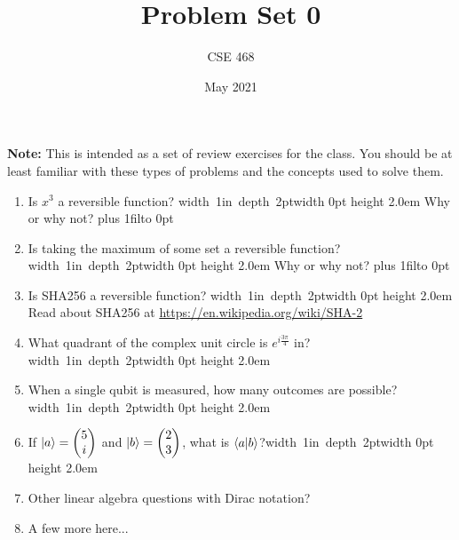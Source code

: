 \documentclass[12pt]{article}
\title{Problem Set 0}
\author{CSE 468}
\date{May 2021}
\newcommand{\Blank}{\mbox{\vrule width 1in depth 2pt}\vrule width 0pt height 2.0em}
\newcommand{\LeaveSpace}[1][1in]{%
\vskip #1 plus 1fil\relax\hbox to 0pt{\hss} %
}
\begin{document}
\maketitle

\noindent \textbf{Note:} This is intended as a set of review exercises for the class. You should be at least familiar with these types of problems and the concepts used to solve them.

\begin{enumerate}[font=\bfseries]
    \item Is $x^3$ a reversible function? \Blank{} Why or why not? \LeaveSpace[0.5in]
    \item Is taking the maximum of some set a reversible function? \Blank{} Why or why not?\LeaveSpace{}
    \item Is SHA256 a reversible function? \Blank{} Read about SHA256 at \href{https://en.wikipedia.org/wiki/SHA-2}{https://en.wikipedia.org/wiki/SHA-2} 
    \item What quadrant of the complex unit circle is $e^{i\frac{3\pi}{4}}$ in?\Blank{}
    \item When a single qubit is measured, how many outcomes are possible?\Blank{}
    \item If $\ket{a} = \begin{pmatrix}5 \\ i \end{pmatrix}$ and $\ket{b} = \begin{pmatrix}2 \\ 3 \end{pmatrix}$, what is $\braket{a|b}$?\Blank{}
    \item Other linear algebra questions with Dirac notation?
    \item A few more here...
    
\end{enumerate}
\end{document}
